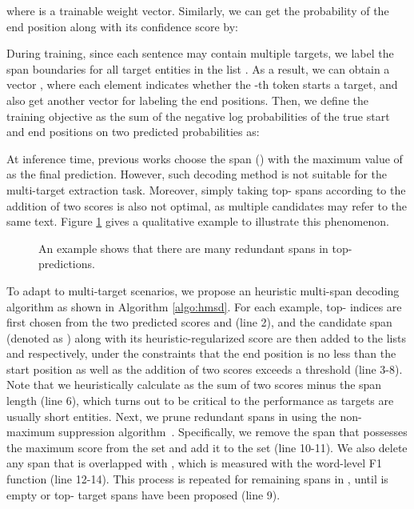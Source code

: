 \documentclass[11pt,a4paper]{article}
\begin{document}
where  is a trainable weight vector. Similarly, we can get the probability of the end position along with its confidence score by:


During training, since each sentence may contain multiple targets, we label the span boundaries for all target entities in the list .
As a result, we can obtain a vector , where each element  indicates whether the -th token starts a target, and also get another vector  for labeling the end positions.
Then, we define the training objective as the sum of the negative log probabilities of the true start and end positions on two predicted probabilities as:


At inference time, previous works choose the span  () with the maximum value of  as the final prediction.
However, such decoding method is not suitable for the multi-target extraction task.
Moreover, simply taking top- spans according to the addition of two scores is also not optimal, as multiple candidates may refer to the same text. 
Figure \ref{fig:redun} gives a qualitative example to illustrate this phenomenon. 

\begin{figure}[h]
\center
{}
\caption{An example shows that there are many redundant spans in top- predictions.}
\label{fig:redun}
\end{figure}

To adapt to multi-target scenarios, we propose an heuristic multi-span decoding algorithm as shown in Algorithm \ref{algo:hmsd}.
For each example, top- indices are first chosen from the two predicted scores  and  (line 2), and the candidate span  (denoted as ) along with its heuristic-regularized score  are then added to the lists  and  respectively, under the constraints that the end position is no less than the start position as well as the addition of two scores exceeds a threshold  (line 3-8).
Note that we heuristically calculate  as the sum of two scores minus the span length (line 6), which turns out to be critical to the performance as targets are usually short entities.
Next, we prune redundant spans in  using the non-maximum suppression algorithm~\cite{rosenfeld1971edge}.
Specifically, we remove the span  that possesses the maximum score  from the set  and add it to the set  (line 10-11).
We also delete any span  that is overlapped with , which is measured with the word-level F1 function (line 12-14).
This process is repeated for remaining spans in , until  is empty or top- target spans have been proposed (line 9).
\end{document}
